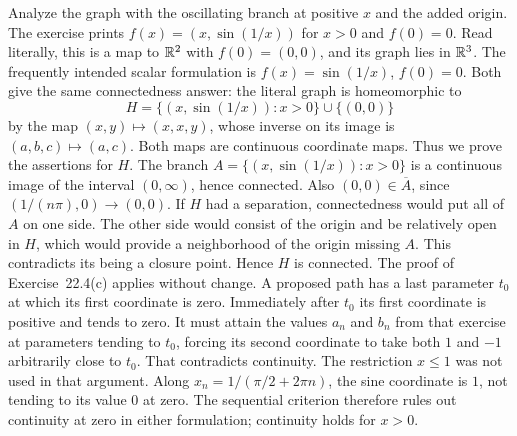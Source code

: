 \goal Analyze the graph with the oscillating branch at positive $x$
and the added origin.
The exercise prints $f(x)=(x,\sin(1/x))$ for $x>0$ and $f(0)=0$.
Read literally, this is a map to $\mathbb{R}^2$ with $f(0)=(0,0)$, and its
graph lies in $\mathbb{R}^3$. The frequently intended scalar formulation is
$f(x)=\sin(1/x)$, $f(0)=0$. Both give the same connectedness answer:
the literal graph is homeomorphic to
\[
 H=\{(x,\sin(1/x)):x>0\}\cup\{(0,0)\}
\]
by the map $(x,y)\mapsto(x,x,y)$, whose inverse on its image is
$(a,b,c)\mapsto(a,c)$. Both maps are continuous coordinate maps.
Thus we prove the assertions for $H$.
The branch $A=\{(x,\sin(1/x)):x>0\}$ is a continuous image of the
interval $(0,\infty)$, hence connected. Also $(0,0)\in\overline A$,
since $(1/(n\pi),0)\to(0,0)$. If $H$ had a separation, connectedness
would put all of $A$ on one side. The other side would consist of the
origin and be relatively open in $H$, which would provide a
neighborhood of the origin missing $A$. This contradicts its being
a closure point. Hence $H$ is connected.
The proof of Exercise~22.4(c) applies without change. A proposed path
has a last parameter $t_0$ at which its first coordinate is zero.
Immediately after $t_0$ its first coordinate is positive and tends
to zero. It must attain the values $a_n$ and $b_n$ from that exercise
at parameters tending to $t_0$, forcing its second coordinate to take
both $1$ and $-1$ arbitrarily close to $t_0$. That contradicts
continuity. The restriction $x\le1$ was not used in that argument.
Along $x_n=1/(\pi/2+2\pi n)$, the sine coordinate is $1$, not tending
to its value $0$ at zero. The sequential criterion therefore rules out
continuity at zero in either formulation; continuity holds for $x>0$.
\answer{The graph is connected but not path-connected, and the
function is not continuous on $[0,\infty)$.}


